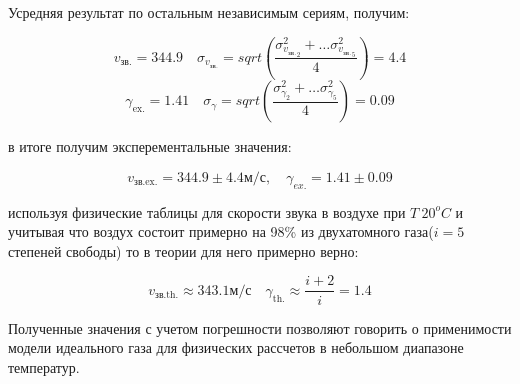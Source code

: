 \documentclass[10pt]{article}
\begin{document}
    Усредняя результат по остальным независимым сериям, получим:

    \begin{equation}
        v_\text{зв.} = 344.9 \quad \sigma_{v_\text{зв.}} = sqrt(\frac{\sigma_{{v_\text{зв.}}_2}^2 + \dots \sigma_{{v_\text{зв.}}_5}^2}{4}) = 4.4 
    \end{equation}
    \begin{equation}
        \gamma_\text{ex.} = 1.41 \quad \sigma_\gamma = sqrt(\frac{\sigma_{\gamma_2}^2 + \dots \sigma_{\gamma_5}^2}{4}) = 0.09 
    \end{equation}

    в итоге получим эксперементальные значения:

    \begin{equation}
        v_\text{зв.ex.} = 344.9 \pm 4.4 \text{м/с}, \quad \gamma_{ex.} = 1.41 \pm 0.09
    \end{equation}

    используя физические таблицы для скорости звука в воздухе при $T ~ 20^o C$ и
    учитывая что воздух состоит примерно на 98\% из двухатомного газа($i = 5$ степеней свободы) то в теории для него примерно верно:

    \begin{equation}
         v_\text{зв.th.} \approx 343.1 \text{м/с} \quad \gamma_\text{th.} \approx \frac{i+2}{i} = 1.4
    \end{equation}

    Полученные значения с учетом погрешности позволяют говорить о применимости модели идеального газа для физических рассчетов в небольшом диапазоне температур.
\end{document}
